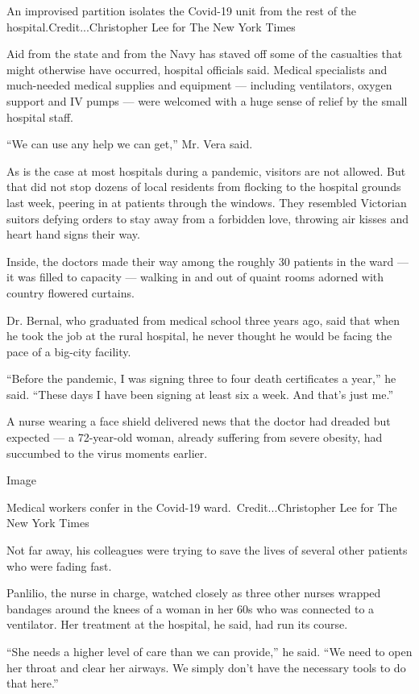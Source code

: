 An improvised partition isolates the Covid-19 unit from the rest of the
hospital.Credit...Christopher Lee for The New York Times

Aid from the state and from the Navy has staved off some of the
casualties that might otherwise have occurred, hospital officials said.
Medical specialists and much-needed medical supplies and equipment ---
including ventilators, oxygen support and IV pumps --- were welcomed
with a huge sense of relief by the small hospital staff.

``We can use any help we can get,'' Mr. Vera said.

As is the case at most hospitals during a pandemic, visitors are not
allowed. But that did not stop dozens of local residents from flocking
to the hospital grounds last week, peering in at patients through the
windows. They resembled Victorian suitors defying orders to stay away
from a forbidden love, throwing air kisses and heart hand signs their
way.

Inside, the doctors made their way among the roughly 30 patients in the
ward --- it was filled to capacity --- walking in and out of quaint
rooms adorned with country flowered curtains.

Dr. Bernal, who graduated from medical school three years ago, said that
when he took the job at the rural hospital, he never thought he would be
facing the pace of a big-city facility.

``Before the pandemic, I was signing three to four death certificates a
year,'' he said. ``These days I have been signing at least six a week.
And that's just me.''

A nurse wearing a face shield delivered news that the doctor had dreaded
but expected --- a 72-year-old woman, already suffering from severe
obesity, had succumbed to the virus moments earlier.

Image

Medical workers confer in the Covid-19 ward.~Credit...Christopher Lee
for The New York Times

Not far away, his colleagues were trying to save the lives of several
other patients who were fading fast.

Panlilio, the nurse in charge, watched closely as three other nurses
wrapped bandages around the knees of a woman in her 60s who was
connected to a ventilator. Her treatment at the hospital, he said, had
run its course.

``She needs a higher level of care than we can provide,'' he said. ``We
need to open her throat and clear her airways. We simply don't have the
necessary tools to do that here.''

